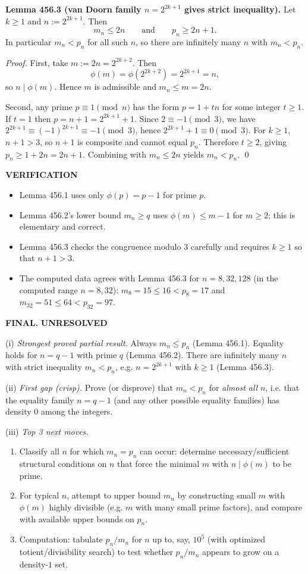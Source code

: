 \medskip

\textbf{Lemma 456.3 (van Doorn family $n=2^{2k+1}$ gives strict inequality).}
Let $k\ge 1$ and $n:=2^{2k+1}$. Then
\[
m_n\le 2n\qquad\text{and}\qquad p_n\ge 2n+1.
\]
In particular $m_n<p_n$ for all such $n$, so there are infinitely many $n$ with $m_n<p_n$.

\emph{Proof.}
First, take $m:=2n=2^{2k+2}$. Then
\[
\phi(m)=\phi(2^{2k+2})=2^{2k+1}=n,
\]
so $n\mid\phi(m)$. Hence $m$ is admissible and $m_n\le m=2n$.

Second, any prime $p\equiv 1\pmod n$ has the form $p=1+tn$ for some integer $t\ge 1$. If $t=1$ then $p=n+1=2^{2k+1}+1$. Since $2\equiv -1\pmod 3$, we have $2^{2k+1}\equiv (-1)^{2k+1}\equiv -1\pmod 3$, hence $2^{2k+1}+1\equiv 0\pmod 3$. For $k\ge 1$, $n+1>3$, so $n+1$ is composite and cannot equal $p_n$.
Therefore $t\ge 2$, giving $p_n\ge 1+2n=2n+1$.
Combining with $m_n\le 2n$ yields $m_n<p_n$.
\qed

\medskip

\textbf{VERIFICATION}

\begin{itemize}
\item Lemma 456.1 uses only $\phi(p)=p-1$ for prime $p$.
\item Lemma 456.2's lower bound $m_n\ge q$ uses $\phi(m)\le m-1$ for $m\ge 2$; this is elementary and correct.
\item Lemma 456.3 checks the congruence modulo $3$ carefully and requires $k\ge 1$ so that $n+1>3$.
\item The computed data agrees with Lemma 456.3 for $n=8,32,128$ (in the computed range $n=8,32$): $m_8=15\le 16<p_8=17$ and $m_{32}=51\le 64<p_{32}=97$.
\end{itemize}

\textbf{FINAL.} \textbf{UNRESOLVED}

(i) \emph{Strongest proved partial result.} Always $m_n\le p_n$ (Lemma 456.1). Equality holds for $n=q-1$ with prime $q$ (Lemma 456.2). There are infinitely many $n$ with strict inequality $m_n<p_n$, e.g. $n=2^{2k+1}$ with $k\ge 1$ (Lemma 456.3).

(ii) \emph{First gap (crisp).} Prove (or disprove) that $m_n<p_n$ for \emph{almost all} $n$, i.e. that the equality family $n=q-1$ (and any other possible equality families) has density $0$ among the integers.

(iii) \emph{Top 3 next moves.}
\begin{enumerate}
\item Classify all $n$ for which $m_n=p_n$ can occur: determine necessary/sufficient structural conditions on $n$ that force the minimal $m$ with $n\mid\phi(m)$ to be prime.
\item For typical $n$, attempt to upper bound $m_n$ by constructing small $m$ with $\phi(m)$ highly divisible (e.g. $m$ with many small prime factors), and compare with available upper bounds on $p_n$.
\item Computation: tabulate $p_n/m_n$ for $n$ up to, say, $10^5$ (with optimized totient/divisibility search) to test whether $p_n/m_n$ appears to grow on a density-$1$ set.
\end{enumerate}

